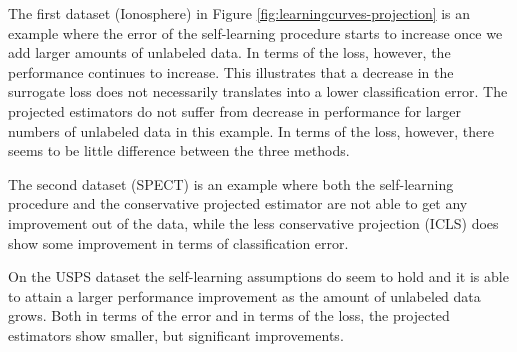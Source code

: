 \documentclass[twoside]{memoir}\usepackage[]{graphicx}\usepackage{xcolor}
\begin{document}
The first dataset (Ionosphere) in Figure \ref{fig:learningcurves-projection} is an example where the error of the self-learning procedure starts to increase once we add larger amounts of unlabeled data. In terms of the loss, however, the performance continues to increase. This illustrates that a decrease in the surrogate loss does not necessarily translates into a lower classification error. The projected estimators do not suffer from decrease in performance for larger numbers of unlabeled data in this example. In terms of the loss, however, there seems to be little difference between the three methods.

The second dataset (SPECT) is an example where both the self-learning procedure and the conservative projected estimator are not able to get any improvement out of the data, while the less conservative projection (ICLS) does show some improvement in terms of classification error.

On the USPS dataset the self-learning assumptions do seem to hold and it is able to attain a larger performance improvement as the amount of unlabeled data grows. Both in terms of the error and in terms of the loss, the projected estimators show smaller, but significant improvements.
\end{document}
